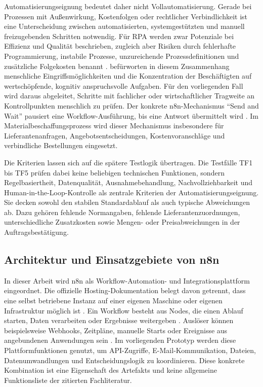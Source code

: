 \documentclass[a4paper,12pt]{article}
\begin{document}
Automatisierungseignung bedeutet daher nicht Vollautomatisierung. Gerade bei Prozessen mit Außenwirkung, Kostenfolgen oder rechtlicher Verbindlichkeit ist eine Unterscheidung zwischen automatisierten, systemgestützten und manuell freizugebenden Schritten notwendig. Für RPA werden zwar Potenziale bei Effizienz und Qualität beschrieben, zugleich aber Risiken durch fehlerhafte Programmierung, instabile Prozesse, unzureichende Prozessdefinitionen und zusätzliche Folgekosten benannt \parencite{brettschneider_bewertung_2020}. \Textcite{ng_systematic_2021} befürworten in diesem Zusammenhang menschliche Eingriffsmöglichkeiten und die Konzentration der Beschäftigten auf wertschöpfende, kognitiv anspruchsvolle Aufgaben. Für den vorliegenden Fall wird daraus abgeleitet, Schritte mit fachlicher oder wirtschaftlicher Tragweite an Kontrollpunkten menschlich zu prüfen. Der konkrete n8n-Mechanismus \enquote{Send and Wait} pausiert eine Workflow-Ausführung, bis eine Antwort übermittelt wird \parencite{n8n_docs_2026}. Im Materialbeschaffungsprozess wird dieser Mechanismus insbesondere für Lieferantenanfragen, Angebotsentscheidungen, Kostenvoranschläge und verbindliche Bestellungen eingesetzt.

Die Kriterien lassen sich auf die spätere Testlogik übertragen. Die Testfälle TF1 bis TF5 prüfen dabei keine beliebigen technischen Funktionen, sondern Regelbasiertheit, Datenqualität, Ausnahmebehandlung, Nachvollziehbarkeit und Human-in-the-Loop-Kontrolle als zentrale Kriterien der Automatisierungseignung. Sie decken sowohl den stabilen Standardablauf als auch typische Abweichungen ab. Dazu gehören fehlende Normangaben, fehlende Lieferantenzuordnungen, unterschiedliche Zusatzkosten sowie Mengen- oder Preisabweichungen in der Auftragsbestätigung.

\subsection{Architektur und Einsatzgebiete von n8n}
In dieser Arbeit wird n8n als Workflow-Automation- und Integrationsplattform eingeordnet. Die offizielle Hosting-Dokumentation belegt davon getrennt, dass eine selbst betriebene Instanz auf einer eigenen Maschine oder eigenen Infrastruktur möglich ist \parencite{n8n_docs_2026}. Ein Workflow besteht aus Nodes, die einen Ablauf starten, Daten verarbeiten oder Ergebnisse weitergeben \parencite{n8n_docs_2026}. Auslöser können beispielsweise Webhooks, Zeitpläne, manuelle Starts oder Ereignisse aus angebundenen Anwendungen sein \parencite{n8n_docs_2026,venkiteela_n8n_2025}. Im vorliegenden Prototyp werden diese Plattformfunktionen genutzt, um API-Zugriffe, E-Mail-Kommunikation, Dateien, Datenumwandlungen und Entscheidungslogik zu koordinieren. Diese konkrete Kombination ist eine Eigenschaft des Artefakts und keine allgemeine Funktionsliste der zitierten Fachliteratur.
\end{document}
